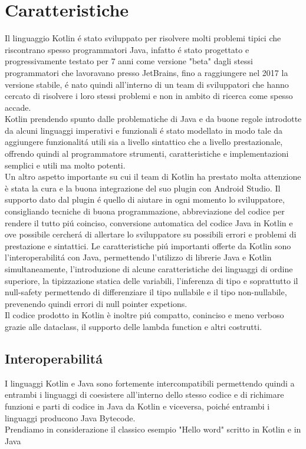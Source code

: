 \section{Caratteristiche}
Il linguaggio Kotlin \'e stato sviluppato per risolvere molti problemi tipici che riscontrano spesso programmatori Java, infatto  \'e stato progettato e progressivamente testato per 7 anni come versione "beta" dagli stessi programmatori che lavoravano presso JetBrains, fino a raggiungere nel 2017 la versione stabile, \'e nato quindi all'interno di un team di sviluppatori che hanno cercato di risolvere i loro stessi problemi e non in ambito di ricerca come spesso accade.\\
Kotlin prendendo spunto dalle problematiche di Java e da buone regole introdotte da alcuni linguaggi imperativi e funzionali \'e stato modellato in modo tale da aggiungere funzionalit\'a utili sia a livello sintattico che a livello prestazionale, offrendo quindi al programmatore strumenti, caratteristiche e implementazioni semplici e utili ma molto potenti.\\
Un altro aspetto importante su cui il team di Kotlin ha prestato molta attenzione è stata la cura e la buona integrazione del suo plugin con Android Studio. Il supporto dato dal plugin \'e quello di aiutare in ogni momento lo sviluppatore, consigliando tecniche di buona programmazione, abbreviazione del codice per rendere il tutto pi\'u coinciso, conversione automatica del codice Java in Kotlin e ove possibile cercher\'a di allertare lo sviluppatore su possibili errori e problemi di prestazione e sintattici.
Le caratteristiche pi\'u importanti offerte da Kotlin sono l'interoperabilit\'a con Java, permettendo l'utilizzo di librerie Java e Kotlin simultaneamente, l'introduzione di alcune caratteristiche dei linguaggi di ordine superiore, la tipizzazione statica delle variabili, l'inferenza di tipo e soprattutto il null-safety permettendo di differenziare il tipo nullabile e il tipo non-nullabile, prevenendo quindi errori di null pointer expetions.\\
Il codice prodotto in Kotlin \`e inoltre pi\'u compatto, coninciso e meno verboso grazie alle dataclass, il supporto delle lambda function e altri costrutti.





\subsection{Interoperabilit\'a}
I linguaggi Kotlin e Java sono fortemente intercompatibili permettendo quindi a entrambi i linguaggi di coesistere all'interno dello stesso codice e di richimare funzioni e parti di codice in Java da Kotlin e viceversa, poich\'e entrambi i linguaggi producono Java Bytecode.\\
Prendiamo in considerazione il classico esempio "Hello word" scritto in Kotlin e in Java


